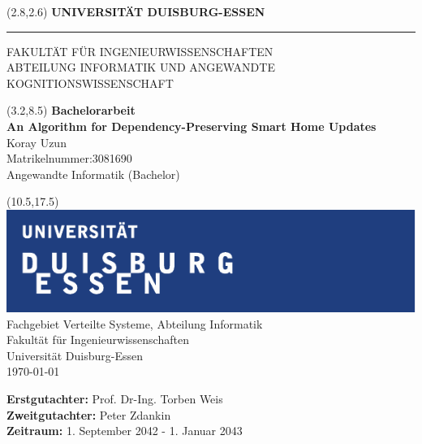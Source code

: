 \begin{titlepage}
\vspace*{-1cm}
\newlength{\links}
\setlength{\links}{0.9cm}
\setlength{\TPHorizModule}{1cm}
\setlength{\TPVertModule}{1cm}
\textblockorigin{0pt}{0pt}

\sffamily
\LARGE

\begin{textblock}{16.5}(2.8,2.6)
 \hspace*{-0.25cm} \textbf{UNIVERSITÄT DUISBURG-ESSEN} \\
 \hspace*{-1.15cm} \rule{5mm}{5mm} \hspace*{0.05cm} FAKULTÄT FÜR INGENIEURWISSENSCHAFTEN\\
 \large{}ABTEILUNG INFORMATIK UND ANGEWANDTE KOGNITIONSWISSENSCHAFT\\
\end{textblock}


\begin{textblock}{14.5}(3.2,8.5)
  \large
{ \textbf{Bachelorarbeit}} \\[1cm]
{\LARGE \Large\textbf{An Algorithm for Dependency-Preserving Smart Home Updates}} \\[1.3cm]
Koray Uzun\\
Matrikelnummer:3081690\\
Angewandte Informatik (Bachelor)
\end{textblock}



\begin{textblock}{10}(10.5,17.5)
\includegraphics[scale=1.0]{images/unilogo.pdf}\\
\normalsize
\raggedleft
Fachgebiet Verteilte Systeme, Abteilung Informatik \\
Fakultät für Ingenieurwissenschaften \\
Universität Duisburg-Essen \\[2ex]

\today\\[15ex]
\raggedright
{\textbf{Erstgutachter:}} Prof. Dr-Ing. Torben Weis \\
{\textbf{Zweitgutachter:}} Peter Zdankin \\
{\textbf{Zeitraum:}} 1. September 2042 - 1. Januar 2043 \\
\end{textblock}

\end{titlepage}
